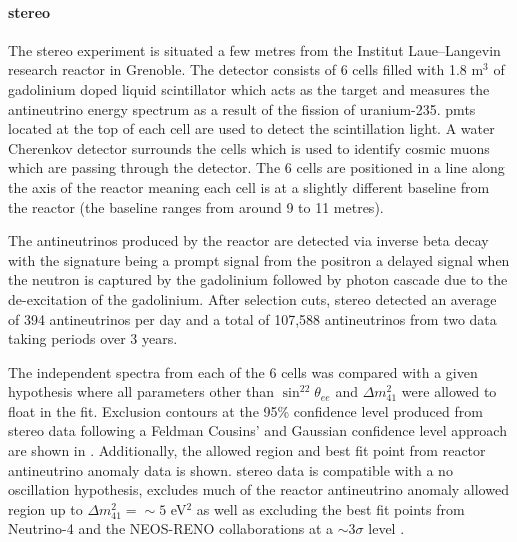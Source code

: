 \newpage
\paragraph{\gls{stereo}}
The \gls{stereo} experiment is situated a few metres from the Institut Laue–Langevin research reactor in Grenoble. The detector consists of 6 cells filled with 1.8 m$^3$ of gadolinium doped liquid scintillator which acts as the target and measures the antineutrino energy spectrum as a result of the fission of uranium-235. \glspl{pmt} located at the top of each cell are used to detect the scintillation light. A water Cherenkov detector surrounds the cells which is used to identify cosmic muons which are passing through the detector. The 6 cells are positioned in a line along the axis of the reactor meaning each cell is at a slightly different baseline from the reactor (the baseline ranges from around 9 to 11 metres). 

The antineutrinos produced by the reactor are detected via inverse beta decay with the signature being a prompt signal from the positron a delayed signal when the neutron is captured by the gadolinium followed by photon cascade due to the de-excitation of the gadolinium. After selection cuts, \gls{stereo} detected an average of 394 antineutrinos per day and a total of 107,588 antineutrinos from two data taking periods over 3 years.  

The independent spectra from each of the 6 cells was compared with a given hypothesis where all parameters other than $\sin^22\theta_{ee}$ and $\Delta m^2_{41}$ were allowed to float in the fit. Exclusion contours at the 95\% confidence level produced from \gls{stereo} data following a Feldman Cousins' and Gaussian confidence level approach are shown in . Additionally, the allowed region and best fit point from reactor antineutrino anomaly data is shown. \gls{stereo} data is compatible with a no oscillation hypothesis, excludes much of the reactor antineutrino anomaly allowed region up to $\Delta m^2_{41} = \sim 5$ eV$^2$ as well as excluding the best fit points from Neutrino-4 and the NEOS-RENO collaborations at a $\sim 3\sigma$ level \cite{STEREO}. 

